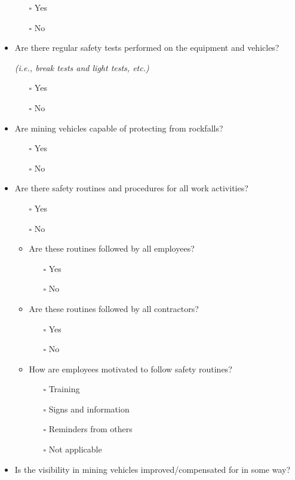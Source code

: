 \documentclass[
  12pt,
]{scrbook}
\providecommand{\tightlist}{%
  \setlength{\itemsep}{0pt}\setlength{\parskip}{0pt}}
\begin{document}
\begin{itemize}
  \begin{itemize}
  \tightlist
  \item[$\square$]
    Yes
  \item[$\square$]
    No
  \end{itemize}
\item
  Are there regular safety tests performed on the equipment and vehicles?

  \emph{(i.e., break tests and light tests, etc.)}

  \begin{itemize}
  \tightlist
  \item[$\square$]
    Yes
  \item[$\square$]
    No
  \end{itemize}
\item
  Are mining vehicles capable of protecting from rockfalls?

  \begin{itemize}
  \tightlist
  \item[$\square$]
    Yes
  \item[$\square$]
    No
  \end{itemize}
\item
  Are there safety routines and procedures for all work activities?

  \begin{itemize}
  \item[$\square$]
    Yes
  \item[$\square$]
    No
  \item
    Are these routines followed by all employees?

    \begin{itemize}
    \tightlist
    \item[$\square$]
      Yes
    \item[$\square$]
      No
    \end{itemize}
  \item
    Are these routines followed by all contractors?

    \begin{itemize}
    \tightlist
    \item[$\square$]
      Yes
    \item[$\square$]
      No
    \end{itemize}
  \item
    How are employees motivated to follow safety routines?

    \begin{itemize}
    \tightlist
    \item[$\square$]
      Training
    \item[$\square$]
      Signs and information
    \item[$\square$]
      Reminders from others
    \item[$\square$]
      Not applicable
    \end{itemize}
  \end{itemize}
\item
  Is the visibility in mining vehicles improved/compensated for in some way?


\end{itemize}
\end{document}
